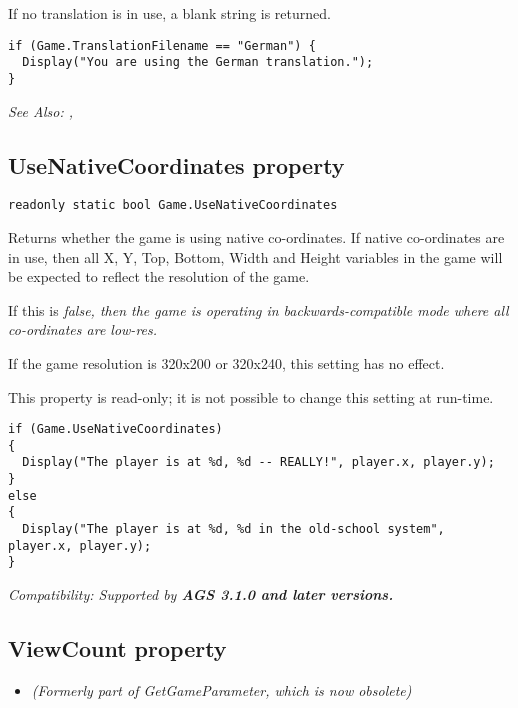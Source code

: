 If no translation is in use, a blank string is returned.

\begin{verbatim}
if (Game.TranslationFilename == "German") {
  Display("You are using the German translation.");
}
\end{verbatim}

\it{See Also:} ,


\subsection{UseNativeCoordinates property}\label{Game.UseNativeCoordinates}%

\begin{verbatim}
readonly static bool Game.UseNativeCoordinates
\end{verbatim}
Returns whether the game is using native co-ordinates. If native co-ordinates are in use,
then all X, Y, Top, Bottom, Width and Height variables in the game will be expected to
reflect the resolution of the game.

If this is \it{false}, then the game is operating in backwards-compatible mode where
all co-ordinates are low-res.

If the game resolution is 320x200 or 320x240, this setting has no effect.

This property is read-only; it is not possible to change this setting at run-time.

\begin{verbatim}
if (Game.UseNativeCoordinates)
{
  Display("The player is at %d, %d -- REALLY!", player.x, player.y);
}
else
{
  Display("The player is at %d, %d in the old-school system", player.x, player.y);
}
\end{verbatim}

\it{Compatibility:} Supported by \bf{AGS 3.1.0} and later versions.


\subsection{ViewCount property}\label{Game.ViewCount}%

\begin{itemize}
\item \it{(Formerly part of GetGameParameter, which is now obsolete)}
\end{itemize}

